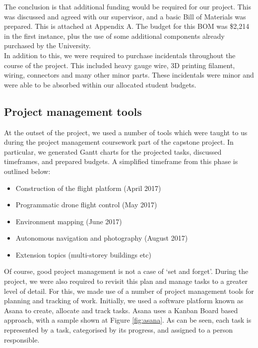 \documentclass[capstone_report.tex]{subfiles}
\begin{document}
The conclusion is that additional funding would be required for our project. This was discussed and agreed with our supervisor, and a basic Bill of Materials was prepared. This is attached at Appendix A. The budget for this BOM was \$2,214 in the first instance, plus the use of some additional components already purchased by the University.\\

In addition to this, we were required to purchase incidentals throughout the course of the project. This included heavy gauge wire, 3D printing filament, wiring, connectors and many other minor parts. These incidentals were minor and were able to be absorbed within our allocated student budgets.

\subsection{Project management tools}
	At the outset of the project, we used a number of tools which were taught to us during the project management coursework part of the capstone project. In particular, we generated Gantt charts for the projected tasks, discussed timeframes, and prepared budgets. A simplified timeframe from this phase is outlined below:

\begin{itemize}
\item Construction of the flight platform (April 2017)
\item Programmatic drone flight control (May 2017)
\item Environment mapping (June 2017)
\item Autonomous navigation and photography (August 2017)
\item Extension topics (multi-storey buildings etc) 
\end{itemize}

Of course, good project management is not a case of `set and forget'. During the project, we were also required to revisit this plan and manage tasks to a greater level of detail. For this, we made use of a number of project management tools for planning and tracking of work. Initially, we used a software platform known as Asana to create, allocate and track tasks. Asana uses a Kanban Board based approach, with a sample shown at Figure \ref{fig:asana}. As can be seen, each task is represented by a task, categorised by its progress, and assigned to a person responsible.
\end{document}
